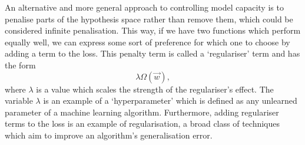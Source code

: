 An alternative and more general approach to controlling model capacity is to penalise parts of the hypothesis space rather than remove them, which could be considered infinite penalisation. This way, if we have two functions which perform equally well, we can express some sort of preference for which one to choose by adding a term to the loss. This penalty term is called a `regulariser' term \cite{DeepLearningBook} and has the form
\begin{equation}
    \lambda\Omega(\vec{w}),
\end{equation}
where $\lambda$ is a value which scales the strength of the regulariser's effect. The variable $\lambda$ is an example of a `hyperparameter' which is defined as any unlearned parameter of a machine learning algorithm. Furthermore, adding regulariser terms to the loss is an example of regularisation, a broad class of techniques which aim to improve an algorithm's generalisation error. 


